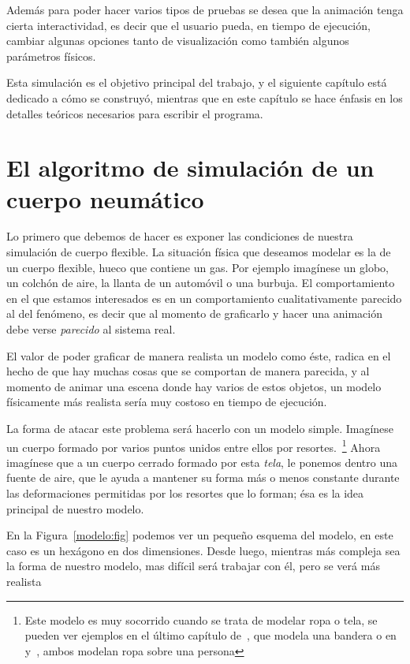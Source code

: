 Además para poder hacer varios tipos de pruebas se desea que la animación tenga cierta interactividad, es decir que el usuario pueda, en tiempo de ejecución, cambiar algunas opciones tanto de visualización como también algunos parámetros físicos.

Esta simulación es el objetivo principal del trabajo, y el siguiente capítulo está dedicado a cómo se construyó, mientras que en este capítulo se hace énfasis en los detalles teóricos necesarios para escribir el programa.

\section{El algoritmo de simulación de un cuerpo neumático}

Lo primero que debemos de hacer es exponer las condiciones de nuestra simulación de cuerpo flexible. La situación física que deseamos modelar es la de un cuerpo flexible, hueco que contiene un gas.
Por ejemplo imagínese un globo, un colchón de aire, la llanta de un automóvil o una burbuja.
El comportamiento en el que estamos interesados es en un comportamiento cualitativamente parecido al del fenómeno, es decir que al momento de graficarlo y hacer una animación debe verse \emph{parecido} al sistema real.

El valor de poder graficar de manera realista un modelo como éste, radica en el hecho de que hay muchas cosas que se comportan de manera parecida, y al momento de animar una escena donde hay varios de estos objetos, un modelo físicamente más realista sería muy costoso en tiempo de ejecución.

La forma de atacar este problema será hacerlo con un modelo simple.
Imagínese un cuerpo formado por varios puntos unidos entre ellos por resortes.~\footnote{Este modelo es muy socorrido cuando se trata de modelar ropa o tela, se pueden ver ejemplos en el último capítulo de~\cite{FisicaVideojuegos}, que modela una bandera o en~\cite{Vassilev:Ropa} y~\cite{Provot:Ropa}, ambos modelan ropa sobre una persona}
Ahora imagínese que a un cuerpo cerrado formado por esta \emph{tela}, le ponemos dentro una fuente de aire, que le ayuda a mantener su forma más o menos constante durante las deformaciones permitidas por los resortes que lo forman; ésa es la idea principal de nuestro modelo.

En la Figura~\ref{modelo:fig} podemos ver un pequeño esquema del modelo, en este caso es un hexágono en dos dimensiones.
Desde luego, mientras más compleja sea la forma de nuestro modelo, mas difícil será trabajar con él, pero se verá más realista 

